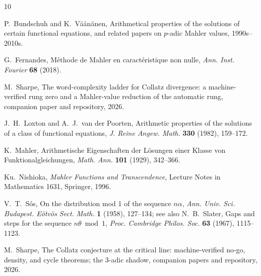\documentclass[11pt]{article}
\theoremstyle{definition}
\begin{document}
\begin{thebibliography}{10}

 P.~Bundschuh and K.~V\"a\"an\"anen, Arithmetical
properties of the solutions of certain functional equations, and
related papers on $p$-adic Mahler values, 1990s--2010s.

 G.~Fernandes, M\'ethode de Mahler en
caract\'eristique non nulle, \emph{Ann. Inst. Fourier} \textbf{68}
(2018).

 M.~Sharpe, The word-complexity ladder for Collatz
divergence: a machine-verified rung zero and a Mahler-value reduction
of the automatic rung, companion paper and repository, 2026.

 J.~H.~Loxton and A.~J.~van der Poorten, Arithmetic
properties of the solutions of a class of functional equations,
\emph{J. Reine Angew. Math.} \textbf{330} (1982), 159--172.

 K.~Mahler, Arithmetische Eigenschaften der
L\"osungen einer Klasse von Funktionalgleichungen, \emph{Math. Ann.}
\textbf{101} (1929), 342--366.

 Ku.~Nishioka, \emph{Mahler Functions and
Transcendence}, Lecture Notes in Mathematics 1631, Springer, 1996.

 V.~T.~S\'os, On the distribution mod 1 of the sequence
$n\alpha$, \emph{Ann. Univ. Sci. Budapest. E\"otv\"os Sect. Math.}
\textbf{1} (1958), 127--134; see also N.~B.~Slater, Gaps and steps
for the sequence $n\theta \bmod 1$, \emph{Proc. Cambridge Philos.
Soc.} \textbf{63} (1967), 1115--1123.

 M.~Sharpe, The Collatz conjecture at the critical
line: machine-verified no-go, density, and cycle theorems; the
$3$-adic shadow, companion papers and repository, 2026.

\end{thebibliography}
\end{document}
